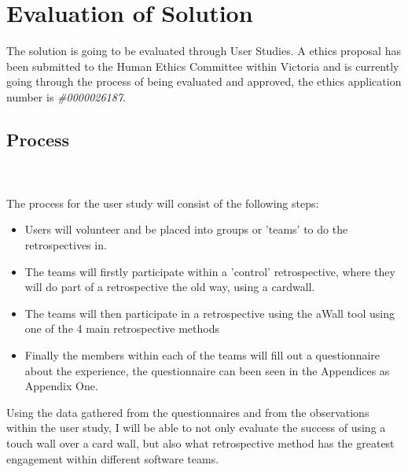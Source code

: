 \chapter{Evaluation of Solution}\label{C:evalution}
The solution is going to be evaluated through User Studies. A ethics proposal has been submitted to the Human Ethics Committee within Victoria and is currently going through the process of being evaluated and approved, the ethics application number is \textit{\#0000026187}. 
\section{Process}
\\\\The process for the user study will consist of the following steps:
\begin{itemize}
\item Users will volunteer and be placed into groups or 'teams' to do the retrospectives in.
\item The teams will firstly participate within a 'control' retrospective, where they will do part of a retrospective the old way, using a cardwall.
\item The teams will then participate in a retrospective using the aWall tool using one of the 4 main retrospective methods
\item Finally the members within each of the teams will fill out a questionnaire about the experience, the questionnaire can been seen in the Appendices as Appendix One. 
\end{itemize}

Using the data gathered from the questionnaires and from the observations within the user study, I will be able to not only evaluate the success of using a touch wall over a card wall, but also what retrospective method has the greatest engagement within different software teams. 
